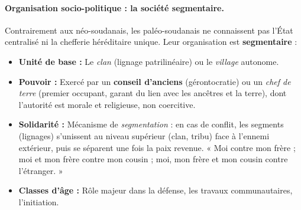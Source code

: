 \documentclass[11pt]{article}
\begin{document}
\paragraph{Organisation socio-politique : la société segmentaire.}
Contrairement aux néo-soudanais, les paléo-soudanais ne connaissent pas l'État centralisé ni la chefferie héréditaire unique. Leur organisation est \textbf{segmentaire} :
\begin{itemize}
    \item \textbf{Unité de base :} Le \emph{clan} (lignage patrilinéaire) ou le \emph{village} autonome.
    \item \textbf{Pouvoir :} Exercé par un \textbf{conseil d'anciens} (gérontocratie) ou un \emph{chef de terre} (premier occupant, garant du lien avec les ancêtres et la terre), dont l'autorité est morale et religieuse, non coercitive.
    \item \textbf{Solidarité :} Mécanisme de \emph{segmentation} : en cas de conflit, les segments (lignages) s'unissent au niveau supérieur (clan, tribu) face à l'ennemi extérieur, puis se séparent une fois la paix revenue. « Moi contre mon frère ; moi et mon frère contre mon cousin ; moi, mon frère et mon cousin contre l'étranger. »
    \item \textbf{Classes d'âge :} Rôle majeur dans la défense, les travaux communautaires, l'initiation.
\end{itemize}
\end{document}
